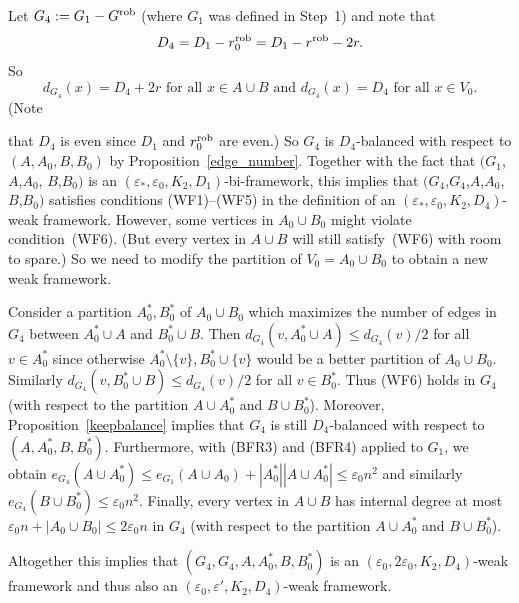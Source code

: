 \documentclass{memo-l}
\def\COMMENT#1{}
\def\eps{\varepsilon}
\numberwithin{section}{chapter}
\numberwithin{equation}{section}
\numberwithin{firstthm}{section}
\numberwithin{figure}{section}
\begin{document}
{Let $G_4:=G_1-G^{\rm rob}$ (where $G_1$ was defined in Step~1) and note that 
\begin{equation} \label{D4D1zz}
D_4= D_1-r_0^{\rm rob}=D_1-r^{\rm rob}-2r.
\end{equation}
So 
\begin{equation} \label{degrees4zz}
d_{G_4}(x)=D_4+2r \mbox{ for all } x \in A \cup B \mbox{  and  } d_{G_4}(x)=D_4 \mbox{ for all } x \in V_0.
\end{equation}
(Note%
   \COMMENT{Daniela deleted "Thus every vertex in $V_0$
has degree $D_4$ in $G_4$ while every vertex in $A\cup B$ has degree $D_4+2r$." which we had immediately after (\ref{degrees4zz}), since
this is what (\ref{degrees4zz}) says}
that $D_4$ is even since $D_1$ and $r_0 ^{\rm rob}$ are even.)
So $G_4$ is $D_4$-balanced with respect to $(A,A_0,B,B_0)$
by Proposition~\ref{edge_number}.
Together with the fact that $(G_1$,$A$,$A_0$, $B$,$B_0)$ is an $(\eps_*,\eps_0,K_2,D_1)$-bi-framework, this implies that
$(G_4$,$G_4$,$A$,$A_0$,$B$,$B_0)$ satisfies conditions (WF1)--(WF5) in the definition of an $(\eps_*,\eps_0,K_2,D_4)$-weak framework.
However, some vertices in $A_0\cup B_0$ might violate condition~(WF6). 
(But every vertex in $A\cup B$ will still satisfy~(WF6) with room to spare.) 
So we need to modify the partition of $V_0=A_0\cup B_0$ to obtain a new weak framework.


Consider a partition $A^*_0,B^*_0$ of $A_0\cup B_0$ which maximizes the number of edges in $G_4$ between
$A^*_0\cup A$ and $B^*_0\cup B$. 
Then $d_{G_4}(v, A^*_0\cup A) \le d_{G_4}(v)/2$ for all $v\in A^*_0$ since otherwise $A^*_0\setminus \{v\},B^*_0\cup \{v\}$ would
be a better partition of $A_0\cup B_0$. Similarly $d_{G_4}(v, B^*_0\cup B) \le d_{G_4}(v)/2$ for all $v\in B^*_0$.
 Thus (WF6) holds in $G_4$ (with respect to the partition
$A\cup A^*_0$ and $B\cup B^*_0$).
Moreover, Proposition~\ref{keepbalance} implies that $G_4$ is still $D_4$-balanced with respect to $(A,A^*_0,B,B^*_0)$.
Furthermore, with (BFR3) and (BFR4) applied to $G_1$, we obtain
$e_{G_4}(A\cup A^*_0)\le e_{G_1}(A\cup A_0)+|A^*_0||A\cup A^* _0|\le \eps_0 n^2$ and similarly $e_{G_4}(B\cup B^*_0)\le \eps_0 n^2$.
Finally, every vertex in $A\cup B$ has internal degree at most $\eps_0 n+|A_0 \cup B_0|\le 2\eps_0 n$ in $G_4$ (with respect to the partition
$A\cup A^*_0$ and $B\cup B^*_0$).%
\COMMENT{osthus replaced V0 with A0 B0} 
Altogether this implies that
$(G_4,G_4,A,A_0^*,B,B_0^*)$ is an $(\eps_0,2\eps_0,K_2,D_4)$-weak framework and thus also an $(\eps_0,\eps',K_2,D_4)$-weak framework.     

}
\end{document}
